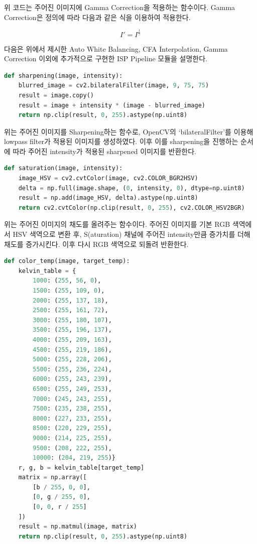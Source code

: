 \documentclass{report}
\begin{document}
위 코드는 주어진 이미지에 Gamma Correction을 적용하는 함수이다.
Gamma Correction은 정의에 따라 다음과 같은 식을 이용하여 적용한다.

$$I' = I ^ {\frac{1}{\gamma}}$$

다음은 위에서 제시한 Auto White Balancing, CFA Interpolation,
Gamma Correction 이외에 추가적으로 구현한 ISP Pipeline 모듈을 설명한다.

\begin{lstlisting}[language=Python, caption=sharpening, firstnumber=103]
def sharpening(image, intensity):
    blurred_image = cv2.bilateralFilter(image, 9, 75, 75)
    result = image.copy()
    result = image + intensity * (image - blurred_image)
    return np.clip(result, 0, 255).astype(np.uint8)
\end{lstlisting}

위는 주어진 이미지를 Sharpening하는 함수로, OpenCV의 `bilateralFilter'를 이용해 lowpass filter가 적용된 이미지를 생성하였다.
이후 이를 sharpening을 진행하는 순서에 따라 주어진 intensity가 적용된 sharpened 이미지를 반환한다.

\begin{lstlisting}[language=Python, caption=saturation, firstnumber=111]
def saturation(image, intensity):
    image_HSV = cv2.cvtColor(image, cv2.COLOR_BGR2HSV)
    delta = np.full(image.shape, (0, intensity, 0), dtype=np.uint8)
    result = np.add(image_HSV, delta).astype(np.uint8)
    return cv2.cvtColor(np.clip(result, 0, 255), cv2.COLOR_HSV2BGR)
\end{lstlisting}

위는 주어진 이미지의 채도를 올려주는 함수이다.
주어진 이미지를 기본 RGB 색역에서 HSV 색역으로 변환 후, S(aturation) 채널에 주어진 intensity만큼 증가치를 더해 채도를 증가시킨다.
이후 다시 RGB 색역으로 되돌려 반환한다.

\begin{lstlisting}[language=Python, caption=color\_temp, firstnumber=135]
def color_temp(image, target_temp):
    kelvin_table = {
        1000: (255, 56, 0),
        1500: (255, 109, 0),
        2000: (255, 137, 18),
        2500: (255, 161, 72),
        3000: (255, 180, 107),
        3500: (255, 196, 137),
        4000: (255, 209, 163),
        4500: (255, 219, 186),
        5000: (255, 228, 206),
        5500: (255, 236, 224),
        6000: (255, 243, 239),
        6500: (255, 249, 253),
        7000: (245, 243, 255),
        7500: (235, 238, 255),
        8000: (227, 233, 255),
        8500: (220, 229, 255),
        9000: (214, 225, 255),
        9500: (208, 222, 255),
        10000: (204, 219, 255)}
    r, g, b = kelvin_table[target_temp]
    matrix = np.array([
        [b / 255, 0, 0],
        [0, g / 255, 0],
        [0, 0, r / 255]
    ])
    result = np.matmul(image, matrix)
    return np.clip(result, 0, 255).astype(np.uint8)
\end{lstlisting}
\end{document}
